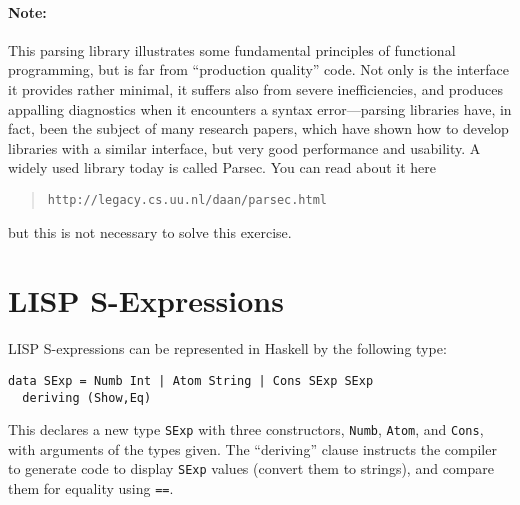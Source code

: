 \documentclass{article}
\begin{document}
\paragraph{Note:} This parsing library illustrates some fundamental
principles of functional programming, but is far from ``production
quality'' code. Not only is the interface it provides rather minimal,
it suffers also from severe inefficiencies, and produces appalling
diagnostics when it encounters a syntax error---parsing libraries
have, in fact, been the subject of many research papers, which have
shown how to develop libraries with a similar interface, but very good
performance and usability. A widely used library today is
called Parsec. You can read about it here
\begin{quote}
\texttt{http://legacy.cs.uu.nl/daan/parsec.html}
\end{quote}
but this is not necessary to solve this exercise.


\section{LISP S-Expressions}
LISP S-expressions can be represented in Haskell by the following
type:
\begin{verbatim}
data SExp = Numb Int | Atom String | Cons SExp SExp
  deriving (Show,Eq)
\end{verbatim}
This declares a new type \texttt{SExp} with three constructors,
\texttt{Numb}, \verb!Atom!, and \verb!Cons!, with arguments of the types
given. The ``deriving'' clause instructs the compiler to generate code
to display \verb!SExp! values (convert them to strings), and compare
them for equality using \verb!==!.
\end{document}
